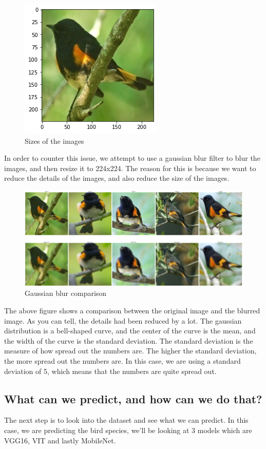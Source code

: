 \begin{figure}[ht]
\centering
\includegraphics[scale=0.6]{size_demo.png}
\caption{Sizes of the images}
\end{figure}

In order to counter this issue, we attempt to use a gaussian blur filter to blur the images, and then resize it to 224x224. The reason for this is because we want to reduce the details of the images, and also reduce the size of the images.

\begin{figure}[h]
\centering
\includegraphics[scale=0.1]{gaussian_blur.png}
\caption{Gaussian blur comparison}
\end{figure}

The above figure shows a comparison between the original image and the blurred image. As you can tell, the details had been reduced by a lot. The gaussian distribution is a bell-shaped curve, and the center of the curve is the mean, and the width of the curve is the standard deviation. The standard deviation is the measure of how spread out the numbers are. The higher the standard deviation, the more spread out the numbers are. In this case, we are using a standard deviation of 5, which means that the numbers are quite spread out. 

\subsection{What can we predict, and how can we do that?}
The next step is to look into the dataset and see what we can predict. In this case, we are predicting the bird species, we'll be looking at 3 models which are VGG16, VIT and lastly MobileNet.

